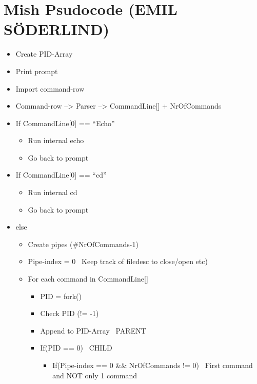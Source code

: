 \documentclass[]{article}
\date{}
\providecommand{\tightlist}{%
  \setlength{\itemsep}{0pt}\setlength{\parskip}{0pt}}
\begin{document}
\hypertarget{mish-psudocode-emil-suxf6derlind}{%
\section{Mish Psudocode (EMIL
SÖDERLIND)}\label{mish-psudocode-emil-suxf6derlind}}

\begin{itemize}
\item
  Create PID-Array
\item
  Print prompt
\item
  Import command-row
\item
  Command-row --\textgreater{} Parser --\textgreater{} CommandLine{[}{]}
  + NrOfCommands
\item
  If CommandLine{[}0{]} == ``Echo''

  \begin{itemize}
  \tightlist
  \item
    Run internal echo
  \item
    Go back to prompt
  \end{itemize}
\item
  If CommandLine{[}0{]} == ``cd''

  \begin{itemize}
  \tightlist
  \item
    Run internal cd
  \item
    Go back to prompt
  \end{itemize}
\item
  else

  \begin{itemize}
  \tightlist
  \item
    Create pipes (\#NrOfCommands-1)
  \item
    Pipe-index = 0 \textbar{}~Keep track of filedesc to close/open etc)
  \item
    For each command in CommandLine{[}{]}

    \begin{itemize}
    \tightlist
    \item
      PID = fork()
    \item
      Check PID (!= -1)
    \item
      Append to PID-Array \textbar{}~PARENT
    \item
      If(PID == 0) \textbar{}~CHILD

      \begin{itemize}
      \tightlist
      \item
        If(Pipe-index == 0 \&\& NrOfCommands != 0) \textbar{}~First
        command and NOT only 1 command


\end{itemize}
\end{itemize}
\end{itemize}
\end{itemize}
\end{document}
